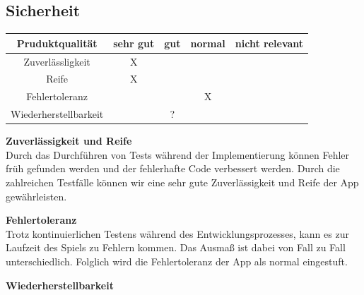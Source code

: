 \documentclass[parskip=full]{scrartcl}
\begin{document}
\subsection{Sicherheit}
\begin{tabular}{| c | c | c | c | c |}
    \hline
    \textbf{Pruduktqualität} & \textbf{sehr gut} & \textbf{gut} & \textbf{normal} & \textbf{nicht relevant} \\ \hline
    Zuverlässligkeit         & X                  &              &                 &                         \\ \hline
    Reife                    & X                  &              &                 &                         \\ \hline
    Fehlertoleranz           &                   &              & X                &                         \\ \hline
    Wiederherstellbarkeit    &                   &  ?            &                 &                         \\ \hline
\end{tabular}

\textbf{Zuverlässigkeit und Reife}\\
Durch das Durchführen von Tests während der Implementierung können Fehler früh gefunden werden und der fehlerhafte Code verbessert werden.
Durch die zahlreichen Testfälle können wir eine sehr gute Zuverlässigkeit und Reife der App gewährleisten.

\textbf{Fehlertoleranz}\\
Trotz kontinuierlichen Testens während des Entwicklungsprozesses, kann es zur Laufzeit des Spiels zu Fehlern kommen.
Das Ausmaß ist dabei von Fall zu Fall unterschiedlich.
Folglich wird die Fehlertoleranz der App als normal eingestuft.

\textbf{Wiederherstellbarkeit}
\end{document}
